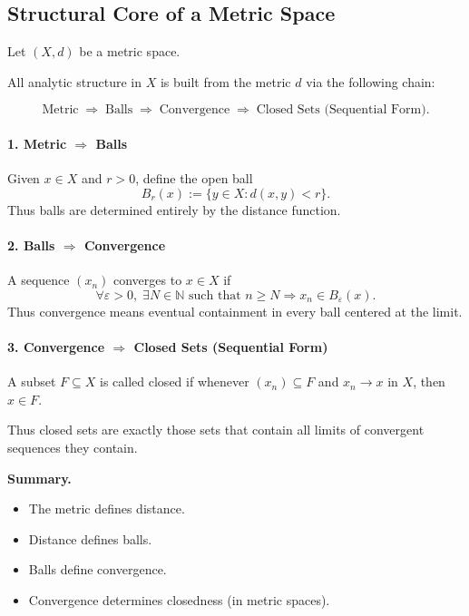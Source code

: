 \subsection*{Structural Core of a Metric Space}

Let $(X,d)$ be a metric space.

All analytic structure in $X$ is built from the metric $d$
via the following chain:

\[
\text{Metric}
\;\Longrightarrow\;
\text{Balls}
\;\Longrightarrow\;
\text{Convergence}
\;\Longrightarrow\;
\text{Closed Sets (Sequential Form)}.
\]

\paragraph{1. Metric $\Longrightarrow$ Balls}
Given $x \in X$ and $r>0$, define the open ball
\[
B_r(x) := \{ y \in X : d(x,y) < r \}.
\]
Thus balls are determined entirely by the distance function.

\paragraph{2. Balls $\Longrightarrow$ Convergence}
A sequence $(x_n)$ converges to $x \in X$ if
\[
\forall \varepsilon > 0,\;
\exists N \in \mathbb{N}
\text{ such that }
n \ge N \Rightarrow x_n \in B_\varepsilon(x).
\]
Thus convergence means eventual containment in every ball
centered at the limit.

\paragraph{3. Convergence $\Longrightarrow$ Closed Sets (Sequential Form)}
A subset $F \subseteq X$ is called closed if
whenever $(x_n) \subseteq F$ and $x_n \to x$ in $X$,
then $x \in F$.

Thus closed sets are exactly those sets that contain
all limits of convergent sequences they contain.

\bigskip

\noindent
\textbf{Summary.}
\begin{itemize}
\item The metric defines distance.
\item Distance defines balls.
\item Balls define convergence.
\item Convergence determines closedness (in metric spaces).
\end{itemize}

